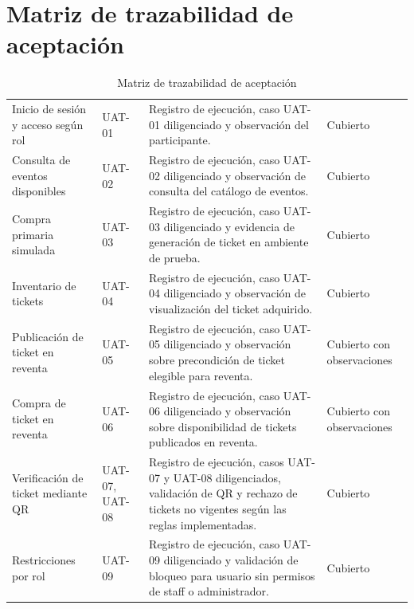 \documentclass[12pt,letterpaper]{article}
\begin{document}
\section{Matriz de trazabilidad de aceptación}

\begin{table}[H]
\centering
\begingroup
\scriptsize
\setlength{\tabcolsep}{3pt}
\renewcommand{\arraystretch}{1.25}

\begin{tabularx}{\textwidth}{|
>{\raggedright\arraybackslash}p{4.0cm}|
>{\centering\arraybackslash}p{2.5cm}|
>{\raggedright\arraybackslash}X|
>{\raggedright\arraybackslash}p{2.6cm}|}
\hline
\multicolumn{1}{|>{\centering\arraybackslash}m{4.0cm}|}{\textbf{Requerimiento / Flujo}} &
\multicolumn{1}{>{\centering\arraybackslash}m{2.5cm}|}{\textbf{Caso UAT asociado}} &
\multicolumn{1}{>{\centering\arraybackslash}m{5.1cm}|}{\textbf{Evidencia}} &
\multicolumn{1}{>{\centering\arraybackslash}m{2.6cm}|}{\textbf{Estado}} \\
\hline
Inicio de sesión y acceso según rol & UAT-01 & Registro de ejecución, caso UAT-01 diligenciado y observación del participante. & Cubierto \\
\hline
Consulta de eventos disponibles & UAT-02 & Registro de ejecución, caso UAT-02 diligenciado y observación de consulta del catálogo de eventos. & Cubierto \\
\hline
Compra primaria simulada & UAT-03 & Registro de ejecución, caso UAT-03 diligenciado y evidencia de generación de ticket en ambiente de prueba. & Cubierto \\
\hline
Inventario de tickets & UAT-04 & Registro de ejecución, caso UAT-04 diligenciado y observación de visualización del ticket adquirido. & Cubierto \\
\hline
Publicación de ticket en reventa & UAT-05 & Registro de ejecución, caso UAT-05 diligenciado y observación sobre precondición de ticket elegible para reventa. & Cubierto con observaciones \\
\hline
Compra de ticket en reventa & UAT-06 & Registro de ejecución, caso UAT-06 diligenciado y observación sobre disponibilidad de tickets publicados en reventa. & Cubierto con observaciones \\
\hline
Verificación de ticket mediante QR & UAT-07, UAT-08 & Registro de ejecución, casos UAT-07 y UAT-08 diligenciados, validación de QR y rechazo de tickets no vigentes según las reglas implementadas. & Cubierto \\
\hline
Restricciones por rol & UAT-09 & Registro de ejecución, caso UAT-09 diligenciado y validación de bloqueo para usuario sin permisos de staff o administrador. & Cubierto \\
\hline
\end{tabularx}

\endgroup
\caption{Matriz de trazabilidad de aceptación}
\label{tab:matriz-trazabilidad-uat}
\end{table}
\end{document}
